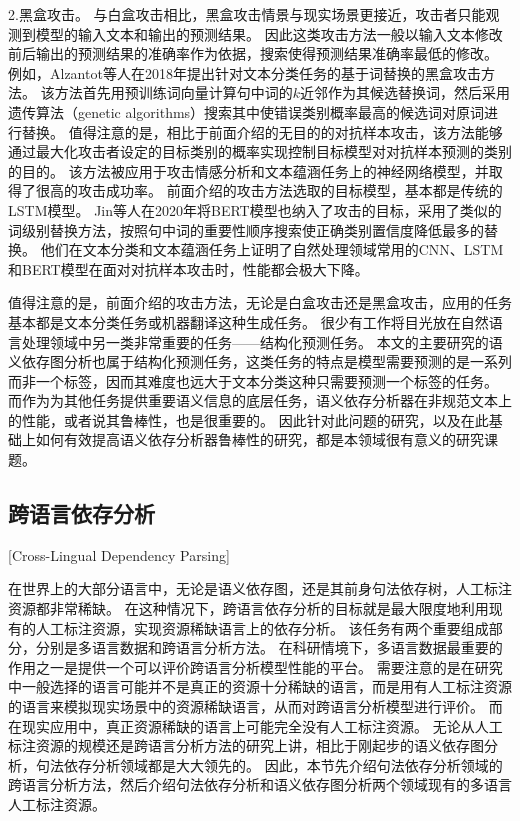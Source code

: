 2.黑盒攻击。
与白盒攻击相比，黑盒攻击情景与现实场景更接近，攻击者只能观测到模型的输入文本和输出的预测结果。
因此这类攻击方法一般以输入文本修改前后输出的预测结果的准确率作为依据，搜索使得预测结果准确率最低的修改。
例如，Alzantot等人在2018年提出针对文本分类任务的基于词替换的黑盒攻击方法\cite{alzantot-etal-2018-generating}。
该方法首先用预训练词向量计算句中词的$k$近邻作为其候选替换词，然后采用遗传算法（genetic algorithms）搜索其中使错误类别概率最高的候选词对原词进行替换。
值得注意的是，相比于前面介绍的无目的的对抗样本攻击，该方法能够通过最大化攻击者设定的目标类别的概率实现控制目标模型对对抗样本预测的类别的目的。
该方法被应用于攻击情感分析和文本蕴涵任务上的神经网络模型，并取得了很高的攻击成功率。
前面介绍的攻击方法选取的目标模型，基本都是传统的LSTM模型。
Jin等人在2020年将BERT模型也纳入了攻击的目标\cite{jin-etal-2020-isbert}，采用了类似的词级别替换方法，按照句中词的重要性顺序搜索使正确类别置信度降低最多的替换。
他们在文本分类和文本蕴涵任务上证明了自然处理领域常用的CNN、LSTM和BERT模型在面对对抗样本攻击时，性能都会极大下降。

值得注意的是，前面介绍的攻击方法，无论是白盒攻击还是黑盒攻击，应用的任务基本都是文本分类任务或机器翻译这种生成任务。
很少有工作将目光放在自然语言处理领域中另一类非常重要的任务——结构化预测任务。
本文的主要研究的语义依存图分析也属于结构化预测任务，这类任务的特点是模型需要预测的是一系列而非一个标签，因而其难度也远大于文本分类这种只需要预测一个标签的任务。
而作为为其他任务提供重要语义信息的底层任务，语义依存分析器在非规范文本上的性能，或者说其鲁棒性，也是很重要的。
因此针对此问题的研究，以及在此基础上如何有效提高语义依存分析器鲁棒性的研究，都是本领域很有意义的研究课题。

\subsection{跨语言依存分析}[Cross-Lingual Dependency Parsing]

在世界上的大部分语言中，无论是语义依存图，还是其前身句法依存树，人工标注资源都非常稀缺。
在这种情况下，跨语言依存分析的目标就是最大限度地利用现有的人工标注资源，实现资源稀缺语言上的依存分析。
该任务有两个重要组成部分，分别是多语言数据和跨语言分析方法。
在科研情境下，多语言数据最重要的作用之一是提供一个可以评价跨语言分析模型性能的平台。
需要注意的是在研究中一般选择的语言可能并不是真正的资源十分稀缺的语言，而是用有人工标注资源的语言来模拟现实场景中的资源稀缺语言，从而对跨语言分析模型进行评价。
而在现实应用中，真正资源稀缺的语言上可能完全没有人工标注资源。
无论从人工标注资源的规模还是跨语言分析方法的研究上讲，相比于刚起步的语义依存图分析，句法依存分析领域都是大大领先的。
因此，本节先介绍句法依存分析领域的跨语言分析方法，然后介绍句法依存分析和语义依存图分析两个领域现有的多语言人工标注资源。

